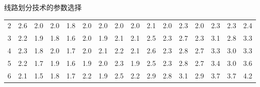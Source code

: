 \documentclass[aspectratio=1610]{ctexbeamer}
\begin{document}
\begin{frame}{线路划分技术的参数选择}
\begin{table}[!htbp]
{\begin{tabular}{c|ccccccccccccccc}
            \rowcolor[HTML]{FFFFFF}
            2                          & \multicolumn{1}{l|}{2.6} & \cellcolor[HTML]{CCC0DA}2.0 & \cellcolor[HTML]{CCC0DA}2.0 & \cellcolor[HTML]{CCC0DA}1.8 & \cellcolor[HTML]{CCC0DA}2.0 & \cellcolor[HTML]{CCC0DA}2.0 & \multicolumn{1}{l|}{\cellcolor[HTML]{CCC0DA}2.0} & \cellcolor[HTML]{CCC0DA}2.0 & 2.1                       & \cellcolor[HTML]{CCC0DA}2.0                         & 2.3                         & \cellcolor[HTML]{CCC0DA}2.0                        & 2.3                         & 2.3                         & 2.4                         \\
    \rowcolor[HTML]{FFFFFF}  
            3                          & \multicolumn{1}{l|}{\cellcolor[HTML]{FFFFFF}2.2} & \cellcolor[HTML]{CCC0DA}1.9 & \cellcolor[HTML]{CCC0DA}1.8 & \cellcolor[HTML]{CCC0DA}1.6 & \cellcolor[HTML]{CCC0DA}2.0 & \multicolumn{1}{l|}{\cellcolor[HTML]{CCC0DA}1.9} & 2.1                        & 2.1                         & 2.5                         & 2.3                         & 2.7                         & 2.3                         & 3.1                         & 2.8                         & 3.3                         \\
            \rowcolor[HTML]{FFFFFF} 
            4                          & \multicolumn{1}{l|}{\cellcolor[HTML]{FFFFFF}2.3} & \cellcolor[HTML]{CCC0DA}1.8 & \cellcolor[HTML]{CCC0DA}2.0 & \cellcolor[HTML]{CCC0DA}1.7 & \cellcolor[HTML]{CCC0DA}2.0 & \multicolumn{1}{l|}{\cellcolor[HTML]{FFFFFF}2.1} & 2.2                        & 2.1                         & 2.6                         & 2.3                         & 2.8                         & 2.7                         & 3.3                         & 3.0                         & 3.3                         \\
            \rowcolor[HTML]{FFFFFF} 
            5                          & \multicolumn{1}{l|}{\cellcolor[HTML]{FFFFFF}2.2} & \cellcolor[HTML]{CCC0DA}1.7 & \cellcolor[HTML]{CCC0DA}1.9 & \cellcolor[HTML]{CCC0DA}1.6 & \cellcolor[HTML]{CCC0DA}1.9 & \multicolumn{1}{l|}{\cellcolor[HTML]{CCC0DA}2.0} & 2.3                        & \cellcolor[HTML]{CCC0DA}1.9 & 2.5                         & 2.3                         & 2.8                         & 2.7                         & 3.4                         & 3.0                         & 3.6                         \\
            \rowcolor[HTML]{FFFFFF} 
            6                          & \multicolumn{1}{l|}{\cellcolor[HTML]{FFFFFF}2.1} & \cellcolor[HTML]{B1A0C7}1.5 & \cellcolor[HTML]{CCC0DA}1.8 & \cellcolor[HTML]{CCC0DA}1.7 & 2.2                         & \multicolumn{1}{l|}{\cellcolor[HTML]{CCC0DA}1.9} & 2.5                        & 2.2                         & 2.9                         & 2.8                         & 3.1                         & 2.9                         & 3.7                         & 3.7                         & 4.2                         \\

\end{tabular}}
\end{table}
\end{frame}
\end{document}
